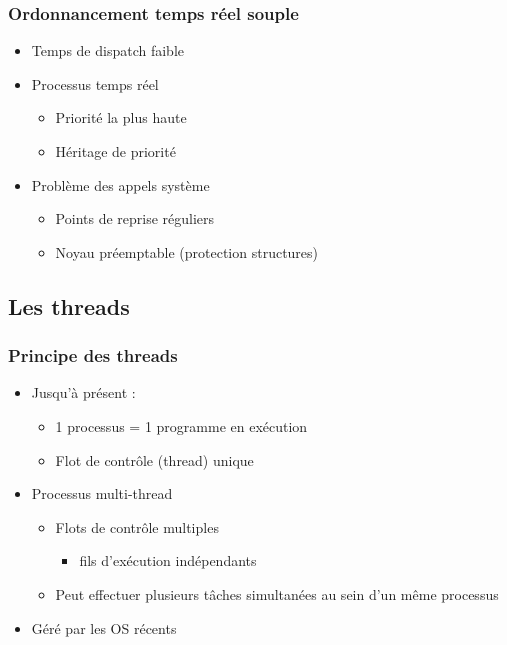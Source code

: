 \begin{frame}
 \frametitle{Ordonnancement temps réel souple}
 \begin{itemize}
 \item Temps de dispatch faible
 \item Processus temps réel
 \begin{itemize}
  \item Priorité la plus haute
  \item Héritage de priorité
 \end{itemize}
 \item Problème des appels système
 \begin{itemize}
  \item Points de reprise réguliers
  \item Noyau préemptable (protection structures)
 \end{itemize}
 \end{itemize}
\end{frame}



\subsection{Les threads}

\begin{frame}
 \frametitle{Principe des threads}
 \begin{itemize}
 \item Jusqu’à présent :
 \begin{itemize}
 \item 1 processus = 1 programme en exécution
 \item Flot de contrôle (thread) unique
 \end{itemize}
 \item Processus multi-thread
 \begin{itemize}
 \item Flots de contrôle multiples
 \begin{itemize}
 \item fils d’exécution indépendants
 \end{itemize}
 \item Peut effectuer plusieurs tâches simultanées au sein d’un même processus
 \end{itemize}
 \item Géré par les OS récents
 \end{itemize}
\end{frame}


